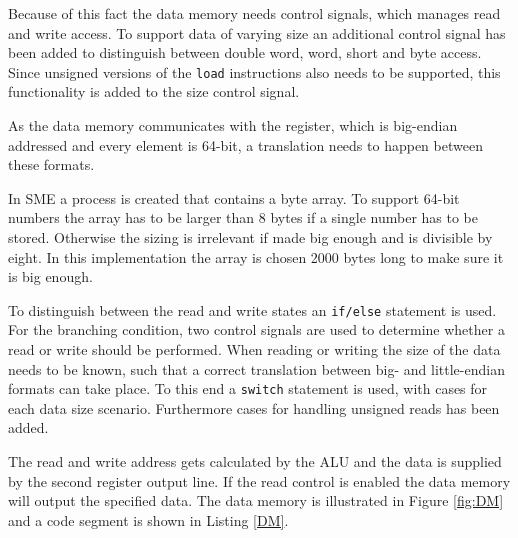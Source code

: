         Because of this fact the data memory needs control signals, which manages read and write access. To support data of varying size an additional control signal has been added to distinguish between double word, word, short and byte access. Since unsigned versions of the \texttt{load} instructions also needs to be supported, this functionality is added to the size control signal.
        
        As the data memory communicates with the register, which is big-endian addressed and every element is 64-bit, a translation needs to happen between these formats.
        
        In SME a process is created that contains a byte array. To support 64-bit numbers the array has to be larger than 8 bytes if a single number has to be stored. Otherwise the sizing is irrelevant if made big enough and is divisible by eight. In this implementation the array is chosen 2000 bytes long to make sure it is big enough.
        
        To distinguish between the read and write states an \texttt{if/else} statement is used. For the branching condition, two control signals are used to determine whether a read or write should be performed. When reading or writing the size of the data needs to be known, such that a correct translation between big- and little-endian formats can take place. To this end a \texttt{switch} statement is used, with cases for each data size scenario. Furthermore cases for handling unsigned reads has been added.
        
        The read and write address gets calculated by the ALU and the data is supplied by the second register output line. If the read control is enabled the data memory will output the specified data. The data memory is illustrated in Figure \ref{fig:DM} and a code segment is shown in Listing \ref{DM}.
        
